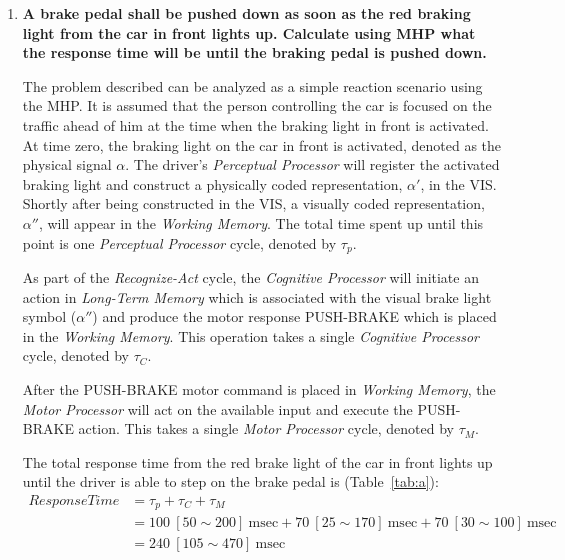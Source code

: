 \begin{enumerate}[label=\alph*)]

\item \textbf{A brake pedal shall be pushed down as soon as the red braking light from the car in front lights up. Calculate using \ac{MHP} what the response time will be until the braking pedal is pushed down.}

The problem described can be analyzed as a simple reaction scenario using the \ac{MHP}. It is assumed that the person controlling the car is focused on the traffic ahead of him at the time when the braking light in front is activated. At time zero, the braking light on the car in front is activated, denoted as the physical signal $\alpha$. The driver's \textit{Perceptual Processor} will register the activated braking light and construct a physically coded representation, $\alpha'$, in the \ac{VIS}. Shortly after being constructed in the \ac{VIS}, a visually coded representation, $\alpha''$, will appear in the \textit{Working Memory}. The total time spent up until this point is one \textit{Perceptual Processor} cycle, denoted by $\tau_p$.

As part of the \textit{Recognize-Act} cycle, the \textit{Cognitive Processor} will initiate an action in \textit{Long-Term Memory} which is associated with the visual brake light symbol ($\alpha''$) and produce the motor response \textsc{PUSH-BRAKE} which is placed in the \textit{Working Memory}. This operation takes a single \textit{Cognitive Processor} cycle, denoted by $\tau_C$.

After the \textsc{PUSH-BRAKE} motor command is placed in \textit{Working Memory}, the \textit{Motor Processor} will act on the available input and execute the \textsc{PUSH-BRAKE} action. This takes a single \textit{Motor Processor} cycle, denoted by $\tau_M$.

\clearpage

The total response time from the red brake light of the car in front lights up until the driver is able to step on the brake pedal is (Table~\ref{tab:a}):
\begin{align*}
\textit{ResponseTime}
&= \tau_p + \tau_C + \tau_M \\
&= 100~[50 \sim 200]~\text{msec} + 70~[25 \sim 170]~\text{msec} + 70~[30 \sim 100]~\text{msec} \\
&= 240~[105 \sim 470]~\text{msec}
\end{align*}

\end{enumerate}

